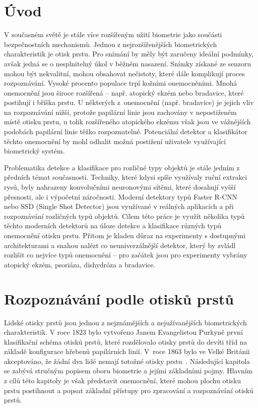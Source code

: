
\chapter{Úvod}
V současném světě je stále více rozšířeným užití biometrie jako součásti bezpečnostních mechanismů. Jednou z nejrozšířenějších biometrických charakteristik je otisk prstu. Pro snímání by měly být zaručeny ideální podmínky, avšak jedná se o nesplnitelný úkol v běžném nasazení. Snímky získané ze senzoru mohou být nekvalitní, mohou obsahovat nečistoty, které dále komplikují proces rozpoznávání. Vysoké procento populace trpí kožními onemocněními. Mnohá onemocnění jsou široce rozšířená -- např. atopický ekzém nebo bradavice, které postihují i bříška prstu. U některých z~onemocnění (např. bradavice) je jejich vliv na rozpoznávání nižší, protože papilární linie jsou zachovány v nepostiženém místě otisku prstu, u tolik rozšířeného atopického ekzému však jsou ve vážnějších podobách papilární linie těžko rozpoznatelné. Potenciální detektor a klasifikátor těchto onemocnění by mohl odhalit možná postižení uživatele využívající biometrický systém.

Problematika detekce a klasifikace pro rozličné typy objektů je stále jedním z předních témat současnosti. Techniky, které kdysi spíše využívaly ruční extrakci rysů, byly nahrazeny konvolučními neuronovými sítěmi, které dosahují vyšší přesnosti, ale i výpočetní náročnosti. Moderní detektory typů Faster R-CNN nebo SSD (Single Shot Detector) jsou využívané v reálných aplikacích a při rozpoznávání rozličných typů objektů. Cílem této práce je využít několika typů těchto moderních detektorů na úloze detekce a klasifikace různých typů onemocnění otisku prstu. Přitom je kladen důraz na experimenty s dostupnými architekturami a snahou nalézt co neuniverzálnější detektor, který by zvládl rozlišit co nejvíce typů onemocnění -- pro začátek jsou pro experimenty vybrány atopický ekzém, psoriáza, dishydróza a bradavice.
\chapter{Rozpoznávání podle otisků prstů}
Lidské otisky prstů jsou jednou z nejznámějších a nejužívanějších biometrických charakteristik. V roce 1823 bylo vytvořeno Janem Evangelistou Purkyně první klasifikační schéma otisků prstů, které rozdělovalo otisky prstů do devíti tříd na základě konfigurace hřebenů papilárních linií. V~roce 1863 bylo ve Velké Británii akceptováno, že žádní dva lidé nemají totožné otisky prstu~\cite{Maltoni2009}. Následující kapitola se zabývá stručným popisem oboru biometrie a jejími základními pojmy. Hlavním z cílů této kapitoly je však představit onemocnění, které mohou plochu otisku prstu postihnout a popsat základní přístupy pro zpracování a rozpoznávání otisků prstů.
